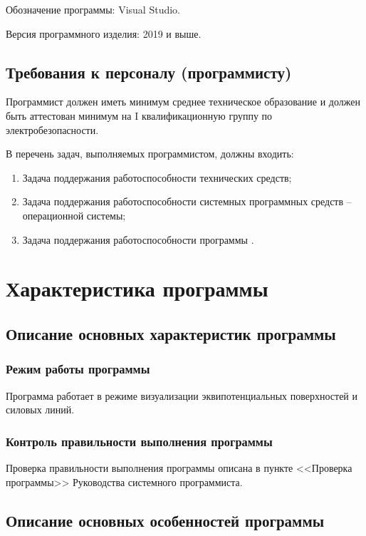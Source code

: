 \documentclass[14pt,a4paper,final]{extreport}
\begin{document}
Обозначение программы: Visual Studio.

Версия программного изделия: 2019 и выше.

\section{Требования к персоналу (программисту)}

Программист должен иметь минимум среднее техническое образование и должен быть аттестован минимум на I квалификационную группу по электробезопасности.

В перечень задач, выполняемых программистом, должны входить:

\begin{enumerate}
	\item[а)] Задача поддержания работоспособности технических средств;
	\item[б)] Задача поддержания работоспособности системных программных средств -- операционной системы;
	\item[в)] Задача поддержания работоспособности программы \programtitle.
\end{enumerate}

\chapter{Характеристика программы}

\section{Описание основных характеристик программы}

\subsection{Режим работы программы}

Программа работает в режиме визуализации эквипотенциальных поверхностей и силовых линий.

\subsection{Контроль правильности выполнения программы}

Проверка правильности выполнения программы описана в пункте <<Проверка программы>> Руководства системного программиста. 

\section{Описание основных особенностей программы}
\end{document}
